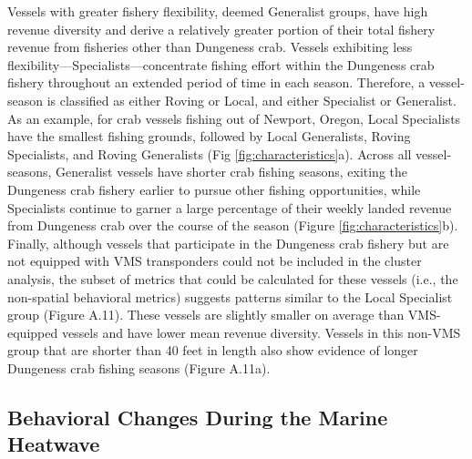 \documentclass[]{elsarticle} %
\begin{document}
Vessels with greater fishery flexibility, deemed Generalist groups, have
high revenue diversity and derive a relatively greater portion of their
total fishery revenue from fisheries other than Dungeness crab. Vessels
exhibiting less flexibility---Specialists---concentrate fishing effort
within the Dungeness crab fishery throughout an extended period of time
in each season. Therefore, a vessel-season is classified as either
Roving or Local, and either Specialist or Generalist. As an example, for
crab vessels fishing out of Newport, Oregon, Local Specialists have the
smallest fishing grounds, followed by Local Generalists, Roving
Specialists, and Roving Generalists (Fig \ref{fig:characteristics}a).
Across all vessel-seasons, Generalist vessels have shorter crab fishing
seasons, exiting the Dungeness crab fishery earlier to pursue other
fishing opportunities, while Specialists continue to garner a large
percentage of their weekly landed revenue from Dungeness crab over the
course of the season (Figure \ref{fig:characteristics}b). Finally,
although vessels that participate in the Dungeness crab fishery but are
not equipped with VMS transponders could not be included in the cluster
analysis, the subset of metrics that could be calculated for these
vessels (i.e., the non-spatial behavioral metrics) suggests patterns
similar to the Local Specialist group (Figure A.11). These vessels are
slightly smaller on average than VMS-equipped vessels and have lower
mean revenue diversity. Vessels in this non-VMS group that are shorter
than 40 feet in length also show evidence of longer Dungeness crab
fishing seasons (Figure A.11a).

\hypertarget{behavioral-changes-during-the-marine-heatwave}{%
\subsection{Behavioral Changes During the Marine
Heatwave}\label{behavioral-changes-during-the-marine-heatwave}}
\end{document}
